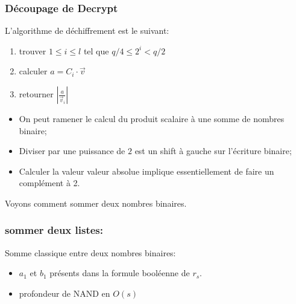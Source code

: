 \documentclass[10pt,xcolor={usenames,dvipsnames}]{beamer}
\begin{document}

\begin{frame}
\frametitle{Découpage de Decrypt}
L'algorithme de déchiffrement est le suivant:
\begin{enumerate}
\item trouver $1 \leqslant i \leqslant l$ tel que $q/4 \leqslant 2^i < q/2$
\item calculer $a = C_i \cdot \vec{v}$
\item retourner $|\frac{a}{\vec{v}_i}|$
\end{enumerate}

\begin{itemize}
\item On peut ramener le calcul du produit scalaire à une somme de nombres binaire;
\item Diviser par une puissance de $2$ est un shift à gauche sur l'écriture binaire;
\item Calculer la valeur valeur absolue implique essentiellement de faire un complément à 2.
\end{itemize}

Voyons comment sommer deux nombres binaires.

\end{frame} 


\begin{frame} 
\frametitle{sommer deux listes: }
Somme classique entre deux nombres binaires:
  \begin{figure}
    \begin{center}
      \begin{tikzpicture}[scale = 1.2, transform shape]
      	
      \end{tikzpicture}
    \end{center}
  \end{figure}
\begin{itemize}
\item $a_1$ et $b_1$ présents dans la formule booléenne de $r_s$.
\item profondeur de NAND en $O(s)$
\end{itemize}
\end{frame} 
    
\end{document}
